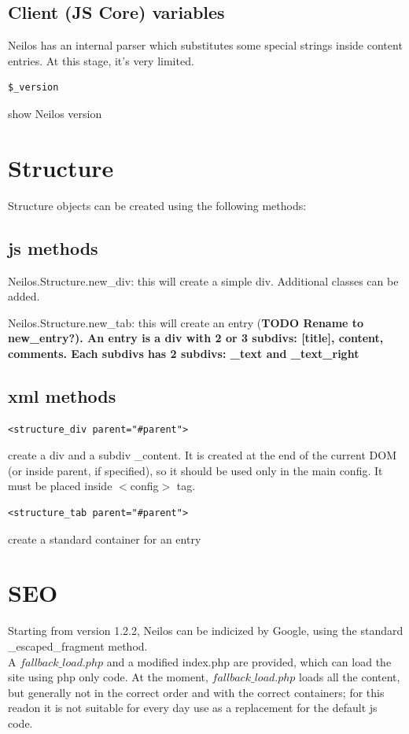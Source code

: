 \documentclass[a4paper,12pt]{article}
\begin{document}
\subsection{Client (JS Core) variables}
Neilos has an internal parser which substitutes some special strings inside content entries. At this stage, it's very limited.
\begin{list}{-}{}
\item \begin{verbatim}
$_version
\end{verbatim}
show Neilos version
\end{list}
\normalsize
\section{Structure}
Structure objects can be created using the following methods:
\subsection{js methods}
\begin{list}{-}{}
 \item Neilos.Structure.new\_div: this will create a simple div. Additional classes can be added.
\item Neilos.Structure.new\_tab: this will create an entry (\bfseries{TODO} \normalfont Rename to new\_entry?). An entry is a div with 2 or 3 subdivs: [title], content, comments. Each subdivs has 2 subdivs: \_text and \_text\_right
\end{list}
\subsection{xml methods}
\begin{list}{-}{}
  \item \begin{verbatim}
<structure_div parent="#parent">         
        \end{verbatim}
create a div and a subdiv \_content. It is created at the end of the current DOM (or inside parent, if specified), so it should be used only in the main config. It must be placed inside $<$config$>$ tag.
  \item \begin{verbatim}
<structure_tab parent="#parent">         
        \end{verbatim}
create a standard container for an entry
\end{list}

\section{SEO}
Starting from version 1.2.2, Neilos can be indicized by Google, using the standard \_escaped\_fragment method.\\
A $fallback\_load.php$ and a modified index.php are provided, which can load the site using php only code.
At the moment, $fallback\_load.php$ loads all the content, but generally not in the correct order and with the correct containers; for this readon it is not suitable for every day use as a replacement for the default js code.
\end{document}
